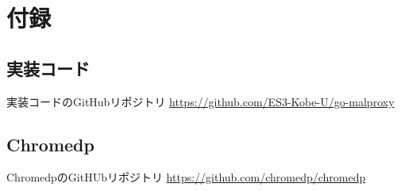\documentclass[dvipdfmx]{jsarticle}
\begin{document}
        \section{付録}
            \subsection{実装コード}
                実装コードのGitHubリポジトリ \url{https://github.com/ES3-Kobe-U/go-malproxy}
            \subsection{Chromedp}
                ChromedpのGitHUbリポジトリ \url{https://github.com/chromedp/chromedp}
\end{document}
